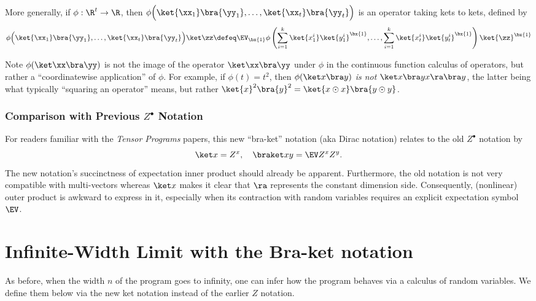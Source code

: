 More generally, if $\phi: \R^t \to \R$, then $\phi\Big(\ket{\xx_1}\bra{\yy_1}, \ldots, \ket{\xx_t}\bra{\yy_t}\Big)$ is an operator taking kets to kets, defined by
\begin{align*}
  \phi\Big(\ket{\xx_1}\bra{\yy_1}, \ldots, \ket{\xx_t}\bra{\yy_t}\Big) \ket \zz \defeq
  \EV_{\bx{1}}\phi\left(\sum_{i=1}^{k}\ket{x_1^{i}}\ket{y_1^{i}}^{\bx{1}}, \ldots, \sum_{i=1}^{k}\ket{x_t^{i}}\ket{y_t^{i}}^{\bx{1}}\right)\ket{\zz}^{\bx{1}}
\end{align*}

\begin{rem}
Note $\phi(\ket \xx \bra \yy)$ is not the image of the operator $\ket \xx \bra \yy$ under $\phi$ in the continuous function calculus of operators, but rather a ``coordinatewise application'' of $\phi$.
For example, if $\phi(t) =t^2$, then $\phi(\ket x \bra y)$ \emph{is not} $\ket x \bra y x\ra \bra y$, the latter being what typically ``squaring an operator'' means, but rather $\ket{x}^2 \bra{y}^2 = \ket{x\odot x}\bra{y\odot y}$.
\end{rem}

\subsubsection{Comparison with Previous $Z^\bullet$ Notation}
For readers familiar with the \emph{Tensor Programs} papers, this new ``bra-ket'' notation
(aka Dirac notation) relates to the old $Z^\bullet$ notation by
\[
\ket x= Z^{x},\quad\braket xy=\EV Z^{x}Z^{y}.
\]
The new notation's succinctness of expectation inner product should already be apparent.
Furthermore, the old notation is not very compatible with multi-vectors whereas $\ket x$ makes it clear that $\ra$ represents the constant dimension side.
Consequently, (nonlinear) outer product is awkward to express in it, especially when its contraction with random variables requires an explicit expectation symbol $\EV$.

    

\section{Infinite-Width Limit with the Bra-ket notation}\label{sec:tp}
As before, when the width $n$ of the program goes to infinity, one can infer how the program behaves via a calculus of random variables.
We define them below via the new ket notation instead of the earlier $Z$ notation.
